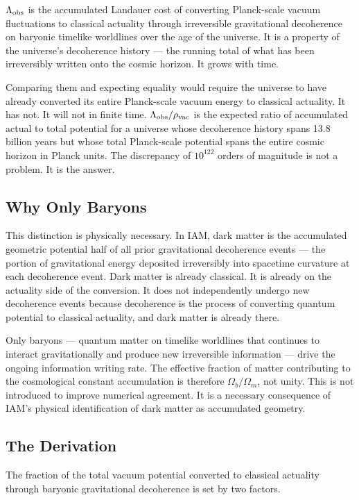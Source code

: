 \documentclass[12pt,a4paper]{article}
\begin{document}
$\Lambda_{\rm obs}$ is the accumulated Landauer cost of converting Planck-scale
vacuum fluctuations to classical actuality through irreversible gravitational
decoherence on baryonic timelike worldlines over the age of the universe. It is
a property of the universe's decoherence history --- the running total of what
has been irreversibly written onto the cosmic horizon. It grows with time.

Comparing them and expecting equality would require the universe to have already
converted its entire Planck-scale vacuum energy to classical actuality. It has
not. It will not in finite time. $\Lambda_{\rm obs}/\rho_{\rm vac}$ is the
expected ratio of accumulated actual to total potential for a universe whose
decoherence history spans 13.8 billion years but whose total Planck-scale
potential spans the entire cosmic horizon in Planck units. The discrepancy of
$10^{122}$ orders of magnitude is not a problem. It is the answer.

\subsection{Why Only Baryons}

This distinction is physically necessary. In IAM, dark matter is the accumulated
geometric potential half of all prior gravitational decoherence events --- the
portion of gravitational energy deposited irreversibly into spacetime curvature
at each decoherence event. Dark matter is already classical. It is already on
the actuality side of the conversion. It does not independently undergo new
decoherence events because decoherence is the process of converting quantum
potential to classical actuality, and dark matter is already there.

Only baryons --- quantum matter on timelike worldlines that continues to
interact gravitationally and produce new irreversible information --- drive the
ongoing information writing rate. The effective fraction of matter contributing
to the cosmological constant accumulation is therefore $\Omega_b/\Omega_m$,
not unity. This is not introduced to improve numerical agreement. It is a
necessary consequence of IAM's physical identification of dark matter as
accumulated geometry.

\subsection{The Derivation}

The fraction of the total vacuum potential converted to classical actuality
through baryonic gravitational decoherence is set by two factors.
\end{document}

